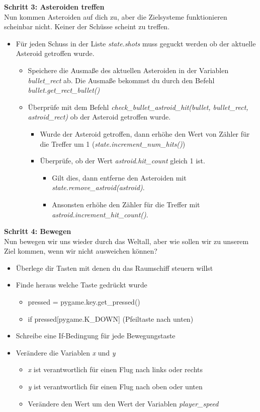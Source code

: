 \textbf{Schritt 3: Asteroiden treffen}\\
Nun kommen Asteroiden auf dich zu, aber die Zielsysteme funktionieren scheinbar nicht. Keiner der Schüsse scheint zu treffen.
\begin{itemize}
	\item Für jeden Schuss in der Liste \textit{state.shots} muss geguckt werden ob der aktuelle Asteroid getroffen wurde.
	\begin{itemize}
		\item Speichere die Ausmaße des aktuellen Asteroiden in der Variablen \textit{bullet\_rect} ab. Die Ausmaße bekommst du durch den Befehl \textit{bullet.get\_rect\_bullet()}
		\item Überprüfe mit dem Befehl \textit{check\_bullet\_astroid\_hit(bullet, bullet\_rect, astroid\_rect)} ob der Asteroid getroffen wurde.
		\begin{itemize}
			\item Wurde der Asteroid getroffen, dann erhöhe den Wert von Zähler für die Treffer um 1 (\textit{state.increment\_num\_hits()})
			\item Überprüfe, ob der Wert \textit{astroid.hit\_count} gleich 1 ist.
			\begin{itemize}
				\item Gilt dies, dann entferne den Asteroiden mit \textit{state.remove\_astroid(astroid)}.
				\item Ansonsten erhöhe den Zähler für die Treffer mit \textit{astroid.increment\_hit\_count()}.
			\end{itemize}
		\end{itemize}
	\end{itemize}
\end{itemize}
\textbf{Schritt 4: Bewegen}\\
Nun bewegen wir uns wieder durch das Weltall, aber wie sollen wir zu unserem Ziel kommen, wenn wir nicht ausweichen können?
\begin{itemize}
	\item Überlege dir Tasten mit denen du das Raumschiff steuern willst
	\item Finde heraus welche Taste gedrückt wurde
	\begin{itemize}
		\item pressed = pygame.key.get\_pressed()
		\item if pressed[pygame.K\_DOWN] (Pfeiltaste nach unten)
	\end{itemize}
	\item Schreibe eine If-Bedingung für jede Bewegungstaste
	\item Verändere die Variablen \textit{x} und \textit{y}
	\begin{itemize}
		\item \textit{x} ist verantwortlich für einen Flug nach links oder rechts
		\item \textit{y} ist verantwortlich für einen Flug nach oben oder unten
		\item Verändere den Wert um den Wert der Variablen \textit{player\_speed}
	\end{itemize}	 
\end{itemize}